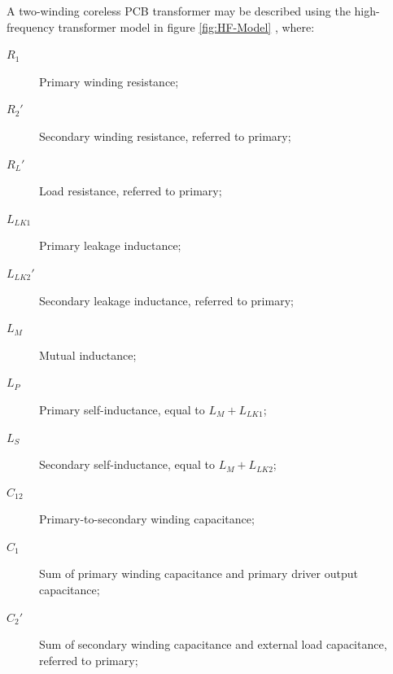 \documentclass[conference]{IEEEtran}
\begin{document}
A two-winding coreless PCB transformer may be described using the high-frequency transformer model in figure \ref{fig:HF-Model} \cite{TangHuiFundamental}, where:
\begin{description}
\item[\hspace{-10pt}$ R_{1} $]    \hspace{-15pt} Primary winding resistance;
\item[\hspace{-10pt}$ R_{2}' $]   \hspace{-15pt} Secondary winding resistance, referred to primary;
\item[\hspace{-10pt}$ R_{L}' $]   \hspace{-15pt} Load resistance, referred to primary;
\item[\hspace{-10pt}$ L_{LK1} $]  \hspace{-15pt} Primary leakage inductance;
\item[\hspace{-10pt}$ L_{LK2}' $] \hspace{-15pt} Secondary leakage inductance, referred to primary;
\item[\hspace{-10pt}$ L_{M} $]    \hspace{-15pt} Mutual inductance;
\item[\hspace{-10pt}$ L_{P} $]    \hspace{-15pt} Primary self-inductance, equal to $ L_{M} + L_{LK1} $;
\item[\hspace{-10pt}$ L_{S} $]    \hspace{-15pt} Secondary self-inductance, equal to $ L_{M} + L_{LK2} $;
\item[\hspace{-10pt}$ C_{12} $]   \hspace{-15pt} Primary-to-secondary winding capacitance;
\item[\hspace{-10pt}$ C_{1} $]    \hspace{-15pt} Sum of primary winding capacitance and primary driver output capacitance;
\item[\hspace{-10pt}$ C_{2}' $]   \hspace{-15pt} Sum of secondary winding capacitance and external load capacitance, referred to primary;

\end{description}
\end{document}
